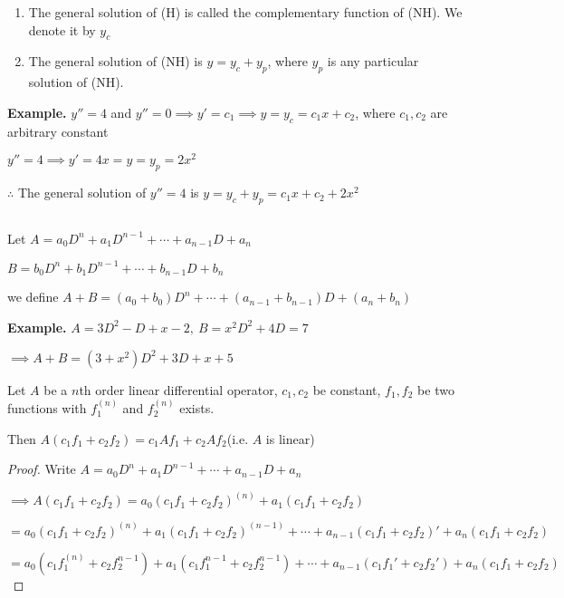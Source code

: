 \begin{defn}$ $
	\begin{enumerate}
		\item The general solution of (H) is called the complementary function of (NH). We denote it by $y_c$
		\item The general solution of (NH) is $y = y_c + y_p$, where $y_p$ is any particular solution of (NH).
	\end{enumerate}
\end{defn}

\textbf{Example.} $y'' = 4$ and $y'' = 0 \implies y' = c_1 \implies y = y_c = c_1x + c_2$, where $c_1,c_2$ are arbitrary constant

$y'' = 4 \implies y' = 4x = y = y_p = 2x^2$

$\therefore$ The general solution of $y'' = 4$ is $y = y_c + y_p = c_1x + c_2 + 2x^2$

\begin{defn}$ $

	Let $A = a_0D^n + a_1D^{n-1} + \cdots + a_{n-1}D + a_n$
	
	$B = b_0 D^n + b_1 D^{n-1} + \cdots + b_{n-1}D + b_n$
	
	we define $A + B = (a_0 + b_0)D^n + \cdots + (a_{n - 1} + b_{n-1})D + (a_n + b_n)$
\end{defn}

\textbf{Example.} $A = 3D^2 - D + x - 2,~ B = x^2D^2 + 4D = 7$

$\implies A + B = (3 + x^2)D^2 + 3D + x + 5$

\begin{rmk*}
	Let $A$ be a $n$th order linear differential operator, $c_1,c_2$ be constant, $f_1,f_2$ be two functions with $f_1^{(n)}$ and $f_2^{(n)}$ exists.
	
	Then $A(c_1f_1 + c_2f_2) = c_1Af_1 + c_2Af_2$(i.e. $A$ is linear)
\end{rmk*}

\begin{proof}
	Write $A = a_0D^n + a_1D^{n-1} + \cdots + a_{n-1}D + a_n$
	
	$\implies A(c_1f_1 + c_2f_2) = a_0(c_1f_1 + c_2f_2)^{(n)} + a_1 (c_1f_1 + c_2f_2)$
	
	$= a_0 (c_1f_1 + c_2f_2)^{(n)} + a_1(c_1f_1 + c_2f_2)^{(n-1)} + \cdots + a_{n-1}(c_1f_1 + c_2f_2)' + a_n(c_1f_1 + c_2 f_2) $
	
	$= a_0 (c_1f_1^{(n)} + c_2f_2^{n-1}) + a_1(c_1f_1^{n-1} + c_2f_2^{n-1}) + \cdots + a_{n-1}(c_1f_1' + c_2f_2') + a_n(c_1f_1 + c_2f_2)$
\end{proof}

